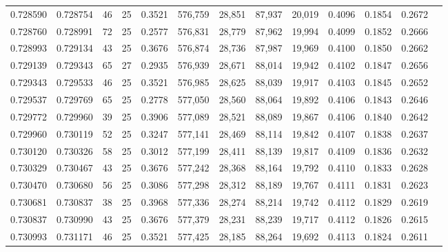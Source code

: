 \begin{tabular}{rrrrrrrrrrrrr}
0.728590 & 0.728754 &    46 &  25 &                                     0.3521 & 576,759 &  28,851 &  87,937 &  20,019 & 0.4096 & 0.1854 & 0.2672 \\
0.728760 & 0.728991 &    72 &  25 &                                     0.2577 & 576,831 &  28,779 &  87,962 &  19,994 & 0.4099 & 0.1852 & 0.2666 \\
0.728993 & 0.729134 &    43 &  25 &                                     0.3676 & 576,874 &  28,736 &  87,987 &  19,969 & 0.4100 & 0.1850 & 0.2662 \\
0.729139 & 0.729343 &    65 &  27 &                                     0.2935 & 576,939 &  28,671 &  88,014 &  19,942 & 0.4102 & 0.1847 & 0.2656 \\
0.729343 & 0.729533 &    46 &  25 &                                     0.3521 & 576,985 &  28,625 &  88,039 &  19,917 & 0.4103 & 0.1845 & 0.2652 \\
0.729537 & 0.729769 &    65 &  25 &                                     0.2778 & 577,050 &  28,560 &  88,064 &  19,892 & 0.4106 & 0.1843 & 0.2646 \\
0.729772 & 0.729960 &    39 &  25 &                                     0.3906 & 577,089 &  28,521 &  88,089 &  19,867 & 0.4106 & 0.1840 & 0.2642 \\
0.729960 & 0.730119 &    52 &  25 &                                     0.3247 & 577,141 &  28,469 &  88,114 &  19,842 & 0.4107 & 0.1838 & 0.2637 \\
0.730120 & 0.730326 &    58 &  25 &                                     0.3012 & 577,199 &  28,411 &  88,139 &  19,817 & 0.4109 & 0.1836 & 0.2632 \\
0.730329 & 0.730467 &    43 &  25 &                                     0.3676 & 577,242 &  28,368 &  88,164 &  19,792 & 0.4110 & 0.1833 & 0.2628 \\
0.730470 & 0.730680 &    56 &  25 &                                     0.3086 & 577,298 &  28,312 &  88,189 &  19,767 & 0.4111 & 0.1831 & 0.2623 \\
0.730681 & 0.730837 &    38 &  25 &                                     0.3968 & 577,336 &  28,274 &  88,214 &  19,742 & 0.4112 & 0.1829 & 0.2619 \\
0.730837 & 0.730990 &    43 &  25 &                                     0.3676 & 577,379 &  28,231 &  88,239 &  19,717 & 0.4112 & 0.1826 & 0.2615 \\
0.730993 & 0.731171 &    46 &  25 &                                     0.3521 & 577,425 &  28,185 &  88,264 &  19,692 & 0.4113 & 0.1824 & 0.2611 \\

\end{tabular}
